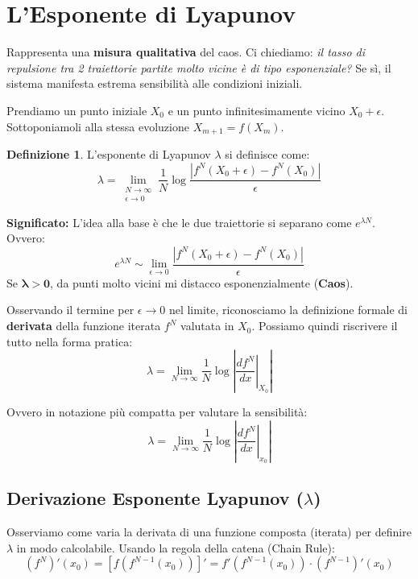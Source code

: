 \documentclass[openany]{book}
\theoremstyle{definition}
\newtheorem*{definizione}{Definizione}
\theoremstyle{remark}
\begin{document}

\section{L'Esponente di Lyapunov}

Rappresenta una \textbf{misura qualitativa} del caos.
Ci chiediamo: \emph{il tasso di repulsione tra 2 traiettorie partite molto vicine è di tipo esponenziale?} Se sì, il sistema manifesta estrema sensibilità alle condizioni iniziali.

Prendiamo un punto iniziale $X_0$ e un punto infinitesimamente vicino $X_0 + \epsilon$.
Sottoponiamoli alla stessa evoluzione $X_{m+1} = f(X_m)$.

\begin{definizione}
L'esponente di Lyapunov $\lambda$ si definisce come:
$$ \lambda = \lim_{\substack{N \to \infty \\ \epsilon \to 0}} \frac{1}{N} \log \frac{|f^N(X_0 + \epsilon) - f^N(X_0)|}{\epsilon} $$
\end{definizione}

\textbf{Significato:}
L'idea alla base è che le due traiettorie si separano come $e^{\lambda N}$. Ovvero:
$$ e^{\lambda N} \sim \lim_{\epsilon \to 0} \frac{|f^N(X_0 + \epsilon) - f^N(X_0)|}{\epsilon} $$
Se $\mathbf{\lambda > 0}$, da punti molto vicini mi distacco esponenzialmente (\textbf{Caos}).

Osservando il termine per $\epsilon \to 0$ nel limite, riconosciamo la definizione formale di \textbf{derivata} della funzione iterata $f^N$ valutata in $X_0$.
Possiamo quindi riscrivere il tutto nella forma pratica:
$$ \lambda = \lim_{N \to \infty} \frac{1}{N} \log \left| \left. \frac{df^N}{dx} \right|_{X_0} \right| $$

Ovvero in notazione più compatta per valutare la sensibilità:
$$ \lambda = \lim_{N \to \infty} \frac{1}{N} \log \left| \left. \frac{df^N}{dx} \right|_{x_0} \right| $$



\subsection*{Derivazione Esponente Lyapunov ($\lambda$)}
Osserviamo come varia la derivata di una funzione composta (iterata) per definire $\lambda$ in modo calcolabile.
Usando la regola della catena (Chain Rule):
$$ (f^N)'(x_0) = \left[ f(f^{N-1}(x_0)) \right]' = f'(f^{N-1}(x_0)) \cdot (f^{N-1})'(x_0) $$
\end{document}
